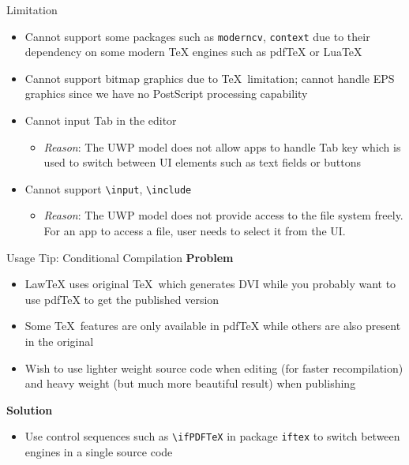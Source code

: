 \documentclass{beamer}
\begin{document}
\begin{frame}{Limitation}
\begin{itemize}
\item Cannot support some packages such as \texttt{moderncv}, \texttt{context} due to their dependency on some modern TeX engines such as pdfTeX or LuaTeX
\item Cannot support bitmap graphics due to \TeX\ limitation; cannot handle EPS graphics since we have no PostScript processing capability
\item Cannot input Tab in the editor
\begin{itemize}
\item \emph{Reason}: The UWP model does not allow apps to handle Tab key which is used to switch between UI elements such as text fields or buttons
\end{itemize}
\item Cannot support \texttt{\textbackslash input}, \texttt{\textbackslash include}
\begin{itemize}
\item \emph{Reason}: The UWP model does not provide access to the file system freely. For an app to access a file, user needs to select it from the UI.
\end{itemize}
\end{itemize}
\end{frame}

\begin{frame}{Usage Tip: Conditional Compilation}
\textbf{Problem}
\begin{itemize}
\item LawTeX uses original \TeX\ which generates DVI while you probably want to use pdfTeX to get the published version
\item Some \TeX\ features are only available in pdfTeX while others are also present in the original
\item Wish to use lighter weight source code when editing (for faster recompilation) and heavy weight (but much more beautiful result) when publishing
\end{itemize}
\textbf{Solution}
\begin{itemize}
\item Use control sequences such as \texttt{\textbackslash ifPDFTeX} in package \texttt{iftex} to switch between engines in a single source code
\end{itemize}
\end{frame}
\end{document}
